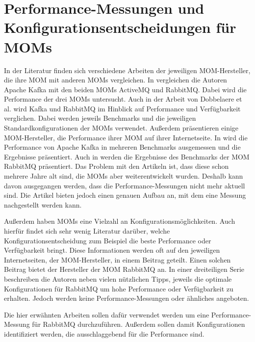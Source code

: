 \section{Performance-Messungen und Konfigurationsentscheidungen für MOMs}
\label{sec:config_mom}
In der Literatur finden sich verschiedene Arbeiten der jeweiligen MOM-Hersteller, die ihre MOM mit anderen MOMs vergleichen. In \cite{kafka} vergleichen die Autoren Apache Kafka mit den beiden MOMs ActiveMQ und RabbitMQ. Dabei wird die Performance der drei MOMs untersucht. Auch in der Arbeit von Dobbelaere et al. \cite{Dobbelaere2017} wird Kafka und RabbitMQ im Hinblick auf Performance und Verfügbarkeit verglichen. Dabei werden jeweils Benchmarks und die jeweiligen Standardkonfigurationen der MOMs verwendet. Außerdem präsentieren einige MOM-Hersteller, die Performance ihrer MOM auf ihrer Internetseite. In \cite{kafkaconfig} wird die Performance von Apache Kafka in mehreren Benchmarks ausgemessen und die Ergebnisse präsentiert. Auch in \cite{rabbitperf} werden die Ergebnisse des Benchmarks der MOM RabbitMQ präsentiert. Das Problem mit den Artikeln ist, dass diese schon mehrere Jahre alt sind, die MOMs aber weiterentwickelt wurden. Deshalb kann davon ausgegangen werden, dass die Performance-Messungen nicht mehr aktuell sind. Die Artikel bieten jedoch einen genauen Aufbau an, mit dem eine Messung nachgestellt werden kann. \par
Außerdem haben MOMs eine Vielzahl an Konfigurationsmöglichkeiten. Auch hierfür findet sich sehr wenig Literatur darüber, welche Konfigurationsentscheidung zum Beispiel die beste Performance oder Verfügbarkeit bringt. Diese Informationen werden oft auf den jeweiligen Internetseiten, der MOM-Hersteller, in einem Beitrag geteilt. Einen solchen Beitrag bietet der Hersteller der MOM RabbitMQ an. In einer dreiteiligen Serie \cite{rabbitconfig} beschreiben die Autoren neben vielen nützlichen Tipps, jeweils die optimale Konfigurationen für RabbitMQ um hohe Performance oder Verfügbarkeit zu erhalten. Jedoch werden keine Performance-Messungen oder ähnliches angeboten.\par
Die hier erwähnten Arbeiten sollen dafür verwendet werden um eine Performance-Messung für RabbitMQ durchzuführen. Außerdem sollen damit Konfigurationen identifiziert werden, die ausschlaggebend für die Performance sind.

